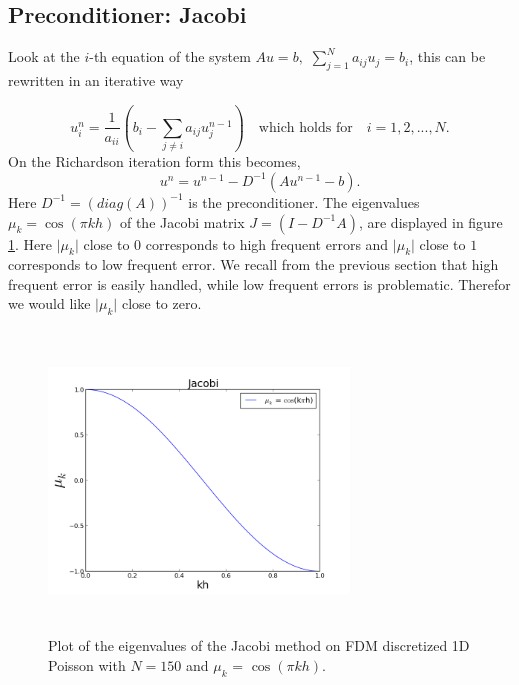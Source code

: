 \subsection{Preconditioner: Jacobi}

Look at the $i$-th equation of the system $Au = b, $ $\sum^{N}_{j = 1} a_{ij}u_j = b_i$, this 
can be rewritten in an iterative way

\begin{equation}
\label{eq:jacobi_scaler}
u^{n}_{i} = \frac{1}{a_{ii}}(b_i - \sum_{j \neq i} a_{ij}u^{n-1}_j) \quad \text{which holds for}\quad i = 1,2, ... , N. 
\end{equation}
On the Richardson iteration form this becomes,
\begin{equation}
\label{eq:jacobi_matrix}
u^n = u^{n-1} - D^{-1}(Au^{n-1} - b).
\end{equation}
Here $D^{-1} = (diag(A))^{-1}$ is the preconditioner. The eigenvalues $\mu_k = \cos(\pi k h)$ of the Jacobi matrix 
$J = (I-D^{-1}A)$, are displayed in figure \ref{fig:Jacobi_eigenvalues}. Here $\vert\mu_k\vert$ 
close to $0$ corresponds to high frequent errors and  $\vert\mu_k\vert$ close to $1$ 
corresponds to low frequent error. We recall from the previous section that high frequent error is easily handled, 
while low frequent errors is problematic. Therefor we would like $\vert\mu_k\vert$ close to zero. 


\begin{figure}
\includegraphics[width=8cm, height=8cm]{chapters/iterative_methods/plots/jacobi_plot}
\caption{Plot of the eigenvalues of the Jacobi method on FDM 
discretized 1D Poisson with $N = 150$ and $\mu_k$ = $\cos(\pi k h )$.}
\label{fig:Jacobi_eigenvalues}
\end{figure}
 

